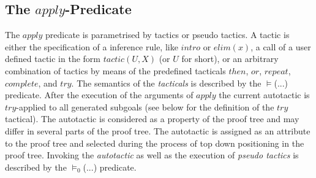 \documentclass[11pt]{report}
\begin{document}
 \subsection{The $apply$-Predicate}
 
 The $apply$ predicate is parametrised by tactics or pseudo tactics.
 A tactic is either the specification of a inference
 rule, like $intro$ or $elim(x)$, a call of a user defined tactic
 in the form $tactic(U,X)$ (or $U$ for short), 
 or an arbitrary combination of tactics by means of the predefined 
 tacticals $then$, $or$, $repeat$, $complete$, and $try$. 
 The semantics of the \emph{tacticals} is described by the
 $\models$(...) predicate. 
 After the execution of the arguments of $apply$ 
 the current autotactic is $try$-applied to all generated
 subgoals (see below for the definition of the $try$ tactical). 
 The autotactic is considered as a property of the
 proof tree and may differ in several parts of the proof tree.
 The autotactic is assigned as an attribute to the proof tree
 and selected during the process of top down positioning
 in the proof tree.
 Invoking the \emph{autotactic} as well as the
 execution of \emph{pseudo tactics} is described by the
 $\models_{0}$(...) predicate.
  
\end{document}
